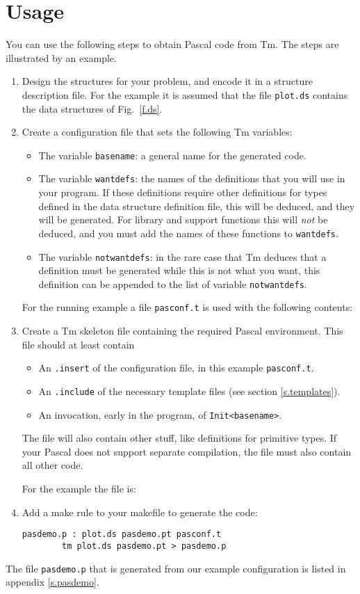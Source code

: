 \documentclass{article}
\newcommand{\Pascal}{\sf Pascal}
\newcommand{\Tm}{\sf Tm}
\newenvironment{listing}{\small\begin{flushleft}}{\end{flushleft}}
\begin{document}
\section{Usage}
\label{s.pasquickintro}
You can use the following steps to obtain {\Pascal} code from {\Tm}.
The steps are illustrated by an example.
\begin{enumerate}
\item
Design the structures for your problem,
and encode it in a structure description file.
For the example it is assumed that the file {\tt plot.ds} contains the
data structures of Fig.~\ref{f.ds}.
\item
Create a configuration file that sets the following {\Tm} variables:
\begin{itemize}
\item
The variable {\tt basename}:
a general name for the generated code.
\item
The variable {\tt wantdefs}: the names of the definitions that you
will use in your program.
If these definitions require other definitions for types defined in
the data structure definition file,
this will be deduced, and they will be generated.
For library and support functions this will {\em not} be deduced,
and you must add the names of these functions to {\tt wantdefs}.
\item
The variable {\tt notwantdefs}:
in the rare case that {\Tm} deduces that a definition must be generated
while this is not what you want,
this definition can be appended to the list of variable {\tt notwantdefs}.
\end{itemize}
For the running example a file {\tt pasconf.t} is used with the
following contents:
\begin{listing}

\end{listing}
\item
Create a {\Tm} skeleton file containing the required {\Pascal} environment.
This file should at least contain
\begin{itemize}
\item
An {\tt .insert} of the configuration file, in this example
{\tt pasconf.t}.
\item
An {\tt .include} of the necessary template files (see
section \ref{s.templates}).
\item
An invocation, early in the program, of {\tt Init<basename>}.
\end{itemize}
The file will also contain other stuff,
like definitions for primitive types.
If your {\Pascal} does not support separate compilation,
the file must also contain all other code.
\par
For the example the file is:
\begin{listing}

\end{listing}
\item
Add a make rule to your makefile to generate the code:
\begin{verbatim}
pasdemo.p : plot.ds pasdemo.pt pasconf.t
        tm plot.ds pasdemo.pt > pasdemo.p
\end{verbatim}
\end{enumerate}
\par
The file {\tt pasdemo.p} that is generated from our
example configuration is listed in appendix \ref{s.pasdemo}.
\end{document}
